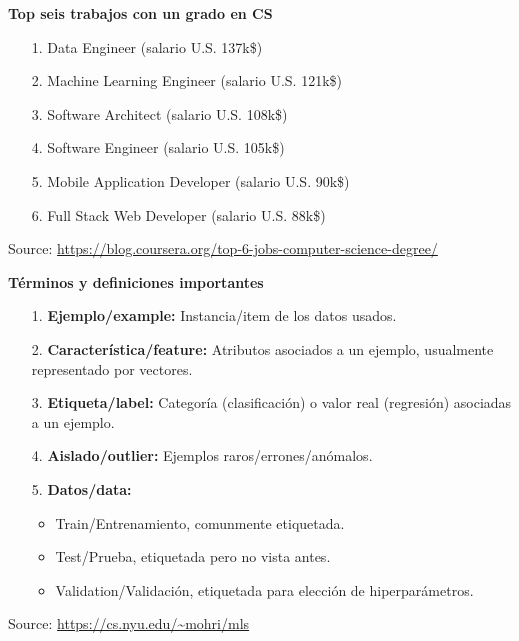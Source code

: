 \documentclass[english,svgnames,notes=hide,12pt]{beamer}
\begin{document}
\begin{frame}
    \textbf{Top seis trabajos con un grado en CS}
    \begin{itemize}
        \item[\small{1.}] Data Engineer (salario U.S. 137k\$)
        \item[\small{2.}] Machine Learning Engineer (salario U.S. 121k\$)
        \item[\small{3.}] Software Architect (salario U.S. 108k\$)
        \item[\small{4.}] Software Engineer (salario U.S. 105k\$)
        \item[\small{5.}] Mobile Application Developer (salario U.S. 90k\$)
        \item[\small{6.}] Full Stack Web Developer (salario U.S. 88k\$)
    \end{itemize}

    \tiny{Source: \url{https://blog.coursera.org/top-6-jobs-computer-science-degree/}}
\end{frame}


\begin{frame}
    \textbf{Términos y definiciones importantes}
    \begin{itemize}
        \item[\small{1.}] \textbf{Ejemplo/example:} Instancia/item de los datos usados.
        \item[\small{2.}] \textbf{Característica/feature:} Atributos asociados a un ejemplo, usualmente representado por vectores.
        \item[\small{3.}] \textbf{Etiqueta/label:} Categoría (clasificación) o valor real (regresión) asociadas a un ejemplo.
        \item[\small{4.}] \textbf{Aislado/outlier:} Ejemplos raros/errones/anómalos.
        \item[\small{5.}] \textbf{Datos/data:}
                \begin{itemize}
                    \item Train/Entrenamiento, comunmente etiquetada.
                    \item Test/Prueba, etiquetada pero no vista antes.
                    \item Validation/Validación, etiquetada para elección de hiperparámetros.
                \end{itemize}
    \end{itemize}

    \tiny{Source: \url{https://cs.nyu.edu/~mohri/mls}}
\end{frame}
\end{document}
